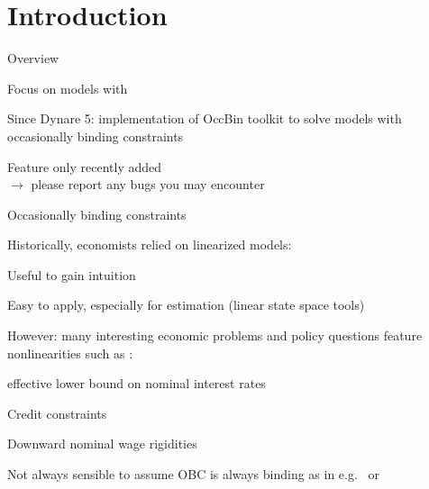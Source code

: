 
\section{Introduction}
\begin{frame}{Overview}
	\begin{wideitemize}
        \item Focus on models with 
        \item Since Dynare 5: implementation of OccBin toolkit to solve models with occasionally binding constraints
        \item Feature only recently added\\
        $\rightarrow$ please report any bugs you may encounter
    \end{wideitemize}
\end{frame}

\begin{frame}{Occasionally binding constraints}
	\begin{wideitemize}
        \item Historically, economists relied on linearized models:
            \begin{wideitemize}
                \item Useful to gain intuition
                \item Easy to apply, especially for estimation (linear state space tools)
            \end{wideitemize}
        \item However: many interesting economic problems and policy questions feature nonlinearities such as :
        \begin{wideitemize}
            \item effective lower bound on nominal interest rates \parencite{ChristianoEichenbaumRebelo2011}
            \item Credit constraints \parencite{GuerrieriIacoviello2017}
            \item Downward nominal wage rigidities \parencite{SGU2016}
        \end{wideitemize}
        \item Not always sensible to assume OBC is always binding as in e.g.\ \textcite{Iacoviello2005} or \textcite{JermannQuadrini2012}
    \end{wideitemize}
\end{frame}


